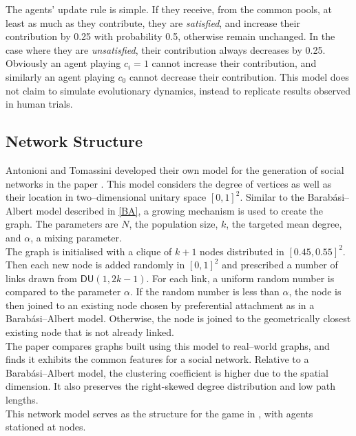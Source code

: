 The agents' update rule is simple. If they receive, from the common pools, at least as much as they contribute, they are \emph{satisfied}, and increase their contribution by 0.25 with probability 0.5, otherwise remain unchanged. In the case where they are \emph{unsatisfied}, their contribution always decreases by 0.25. Obviously an agent playing $c_i =1$ cannot increase their contribution, and similarly an agent playing $c_0$ cannot decrease their contribution. This model does not claim to simulate evolutionary dynamics, instead to replicate results observed in human trials. \\


\subsection{Network Structure}
Antonioni and Tomassini developed their own model for the generation of social networks in the paper \cite{RN51}. This model considers the degree of vertices as well as their location in two--dimensional unitary space $[0,1]^2$. Similar to the Barab\'{a}si--Albert model described in \ref{BA}, a growing mechanism is used to create the graph. The parameters are $N$, the population size, $k$, the targeted mean degree, and $\alpha$, a mixing parameter. \\

The graph is initialised with a clique of $k+1$ nodes distributed in $[0.45, 0.55]^2$. Then each new node is added randomly in $[0,1]^2$ and prescribed a number of links drawn from $\mathsf{DU}(1,2k-1)$. For each link, a uniform random number is compared to the parameter $\alpha$. If the random number is less than $\alpha$, the node is then joined to an existing node chosen by preferential attachment as in a Barab\'{a}si--Albert model. Otherwise, the node is joined to the geometrically closest existing node that is not already linked. \\

The paper \cite{RN51} compares graphs built using this model to real--world graphs, and finds it exhibits the common features for a social network. Relative to a Barab\'{a}si--Albert model, the clustering coefficient is higher due to the spatial dimension. It also preserves the right-skewed degree distribution and low path lengths. \\

This network model serves as the structure for the game in \cite{RN49}, with agents stationed at nodes.

